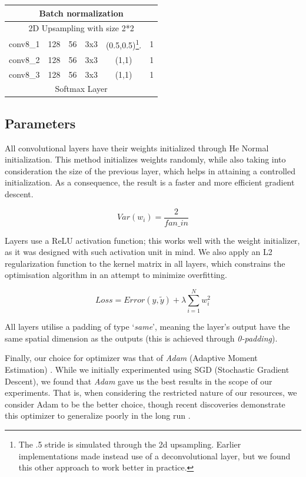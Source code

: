 \documentclass[twoside,twocolumn]{article}
\begin{document}
\begin{table}
\begin{tabular}{|c|c|c|c|c|c|}
	\multicolumn{6}{|c|}{Batch normalization}\\ \hline
	\multicolumn{6}{|c|}{2D Upsampling with size 2*2}\\ \hline
	conv8\_1 & 128 & 56 & 3x3 & (0.5,0.5)\footnote{The .5 stride is simulated through the 2d upsampling. Earlier implementations made instead use of a deconvolutional layer, but we found this other approach to work better in practice.
	}. & 1 \\ \hline
	conv8\_2 & 128 & 56 & 3x3 & (1,1) & 1 \\ \hline
	conv8\_3 & 128 & 56 & 3x3 & (1,1) & 1 \\ \hline
	\multicolumn{6}{|c|}{Softmax Layer}\\ \hline
	
\end{tabular}
\end{table}


\subsection{Parameters}

All convolutional layers have their weights initialized through He Normal \cite{Kaiming:2015} initialization. This method initializes weights randomly, while also taking into consideration the size of the previous layer, which helps in attaining a controlled initialization. As a consequence, the result is a faster and more efficient gradient descent.

\begin{equation}
Var(w_i) = \frac{2}{fan\_in}
\end{equation}

Layers use a ReLU activation function; this works well with the weight initializer, as it was designed with such activation unit in mind. We also apply an L2 regularization function to the kernel matrix in all layers, which constrains the optimisation algorithm in an attempt to minimize overfitting.

\begin{equation}
Loss = Error(y,\tilde{y}) + \lambda\sum_{i=1}^{N} w_i^2
\end{equation}

All layers utilise a padding of type ‘\textit{same}’, meaning the layer’s output have the same spatial dimension as the outputs (this is achieved through \textit{0-padding}).

Finally, our choice for optimizer was that of \textit{Adam} (Adaptive Moment Estimation) \cite{Diaderik:2015}. While we initially experimented using SGD (Stochastic Gradient Descent), we found that \textit{Adam} gave us the best results in the scope of our experiments. That is, when considering the restricted nature of our resources, we consider Adam to be the better choice, though recent discoveries demonstrate this optimizer to generalize poorly in the long run \cite{Nitish:2017}.
\end{document}

